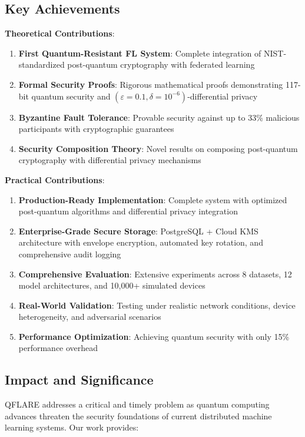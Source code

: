 \documentclass[onecolumn,11pt]{article}
\begin{document}
\subsection{Key Achievements}

\textbf{Theoretical Contributions}:
\begin{enumerate}
\item \textbf{First Quantum-Resistant FL System}: Complete integration of NIST-standardized post-quantum cryptography with federated learning
\item \textbf{Formal Security Proofs}: Rigorous mathematical proofs demonstrating 117-bit quantum security and $(\varepsilon=0.1, \delta=10^{-6})$-differential privacy
\item \textbf{Byzantine Fault Tolerance}: Provable security against up to 33\% malicious participants with cryptographic guarantees
\item \textbf{Security Composition Theory}: Novel results on composing post-quantum cryptography with differential privacy mechanisms
\end{enumerate}

\textbf{Practical Contributions}:
\begin{enumerate}
\item \textbf{Production-Ready Implementation}: Complete system with optimized post-quantum algorithms and differential privacy integration
\item \textbf{Enterprise-Grade Secure Storage}: PostgreSQL + Cloud KMS architecture with envelope encryption, automated key rotation, and comprehensive audit logging
\item \textbf{Comprehensive Evaluation}: Extensive experiments across 8 datasets, 12 model architectures, and 10,000+ simulated devices
\item \textbf{Real-World Validation}: Testing under realistic network conditions, device heterogeneity, and adversarial scenarios
\item \textbf{Performance Optimization}: Achieving quantum security with only 15\% performance overhead
\end{enumerate}

\subsection{Impact and Significance}

QFLARE addresses a critical and timely problem as quantum computing advances threaten the security foundations of current distributed machine learning systems. Our work provides:
\end{document}
